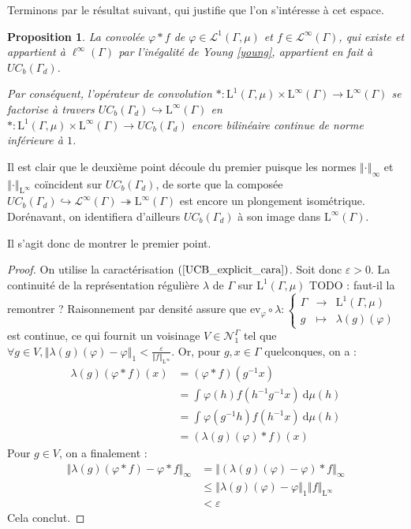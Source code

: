 \documentclass[a4paper,12pt]{article}
\newtheorem{proposition}[theorem]{Proposition}
\newcommand{\ev}{\mathrm{ev}}
\newcommand{\norm}[1]{\left\Vert #1\right\Vert}
\newcommand{\integral}[4]{\int_{#1}^{#2} #3~\mathrm{d}#4}
\newcommand\fundef[3]{#1: \left\{\begin{array}{ccc}#2\\#3\end{array}\right.}
\newcommand{\inv}{^{-1}}
\newcommand{\comp}{\circ}
\newcommand{\nhds}{\mathcal{N}}
\newcommand{\TODO}[1]{{\color{red}TODO :} #1}
\begin{document}
Terminons par le résultat suivant, qui justifie que l'on s'intéresse à cet espace.

\begin{proposition}\label{conv_UCB}
    La convolée $\varphi\ast f$ de $\varphi\in\mathscr{L}^1(\Gamma, \mu)$ et $f\in\mathscr{L}^\infty(\Gamma)$, qui existe et appartient à $\ell^\infty(\Gamma)$ par l'inégalité de Young \ref{young},
    appartient en fait à $UC_b(\Gamma_d)$.

    Par conséquent, l'opérateur de convolution $\ast:\mathrm{L}^1(\Gamma, \mu)\times\mathrm{L}^\infty(\Gamma)\to\mathrm{L}^\infty(\Gamma)$
    se factorise à travers $UC_b(\Gamma_d)\hookrightarrow\mathrm{L}^\infty(\Gamma)$ en 
    $\ast:\mathrm{L}^1(\Gamma, \mu)\times\mathrm{L}^\infty(\Gamma)\to UC_b(\Gamma_d)$ encore bilinéaire continue de norme inférieure à $1$.
\end{proposition}

Il est clair que le deuxième point découle du premier puisque les normes $\norm{\cdot}_\infty$ et $\norm{\cdot}_{\mathrm{L}^\infty}$ coïncident 
sur $UC_b(\Gamma_d)$, de sorte que la composée $UC_b(\Gamma_d)\hookrightarrow\mathscr{L}^\infty(\Gamma)\twoheadrightarrow\mathrm{L}^\infty(\Gamma)$
est encore un plongement isométrique. Dorénavant, on identifiera d'ailleurs $UC_b(\Gamma_d)$ à son image dans $\mathrm{L}^\infty(\Gamma)$.

Il s'agit donc de montrer le premier point.

\begin{proof}
    On utilise la caractérisation $(\ref{UCB_explicit_cara})$. Soit donc $\varepsilon>0$. La continuité de la représentation régulière $\lambda$ de $\Gamma$ sur $\mathrm{L}^1(\Gamma, \mu)$ \TODO{faut-il la remontrer ? Raisonnement par densité}
    assure que 
    $\fundef{\ev_\varphi\comp\lambda}{\Gamma&\to&\mathrm{L}^1(\Gamma, \mu)}{g&\mapsto&\lambda(g)(\varphi)}$ est continue, ce qui fournit 
    un voisinage $V\in\nhds_1^\Gamma$ tel que $\forall g\in V, \norm{\lambda(g)(\varphi) - \varphi}_1<\frac{\varepsilon}{\norm{f}_{\mathrm{L}^\infty}}$. Or, pour $g, x\in \Gamma$ quelconques, on a :
    \begin{align*}
        \lambda(g)(\varphi\ast f)(x)
            &= (\varphi\ast f)(g\inv x) \\
            &= \integral{}{}{\varphi(h)f(h\inv g\inv x)}{\mu(h)} \\
            &= \integral{}{}{\varphi(g\inv h)f(h\inv x)}{\mu(h)} \\
            &= (\lambda(g)(\varphi)\ast f)(x)
    \end{align*}
    Pour $g\in V$, on a finalement :
    \begin{align*}
        \norm{\lambda(g)(\varphi\ast f) - \varphi\ast f}_\infty 
            &= \norm{(\lambda(g)(\varphi) - \varphi)\ast f}_\infty \\
            &\le \norm{\lambda(g)(\varphi) - \varphi}_1\norm{f}_{\mathrm{L}^\infty} \\
            &< \varepsilon
    \end{align*}
    Cela conclut.
\end{proof}
\end{document}
